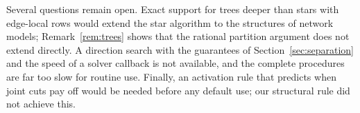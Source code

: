 Several questions remain open. Exact support for trees deeper than stars
with edge-local rows would extend the star algorithm to the structures of
network models; Remark~\ref{rem:trees} shows that the rational partition
argument does not extend directly. A direction search with the guarantees
of Section~\ref{sec:separation} and the speed of a solver callback is not
available, and the complete procedures are far too slow for routine use.
Finally, an activation rule that predicts when joint cuts pay off would be
needed before any default use; our structural rule did not achieve this.

